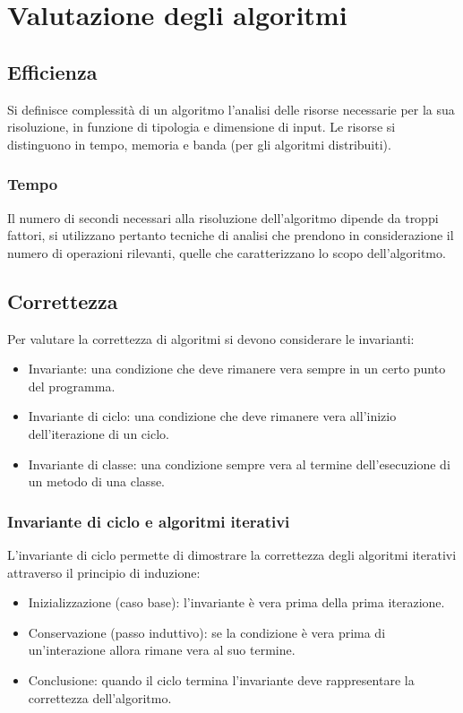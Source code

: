 \section{Valutazione degli algoritmi}
\subsection{Efficienza}
Si definisce complessit\`a di un algoritmo l'analisi delle risorse necessarie per la sua risoluzione, in funzione di tipologia e dimensione di input. Le 
risorse si distinguono in tempo, memoria e banda (per gli algoritmi distribuiti).
\subsubsection{Tempo}
Il numero di secondi necessari alla risoluzione dell'algoritmo dipende da troppi fattori, si utilizzano pertanto tecniche di analisi che prendono in 
considerazione il numero di operazioni rilevanti, quelle che caratterizzano lo scopo dell'algoritmo.
\subsection{Correttezza}
Per valutare la correttezza di algoritmi si devono considerare le invarianti:
\begin{itemize}
\item Invariante: una condizione che deve rimanere vera sempre in un certo punto del programma.
\item Invariante di ciclo: una condizione che deve rimanere vera all'inizio dell'iterazione di un ciclo.
\item Invariante di classe: una condizione sempre vera al termine dell'esecuzione di un metodo di una classe.
\end{itemize}
\subsubsection{Invariante di ciclo e algoritmi iterativi}
L'invariante di ciclo permette di dimostrare la correttezza degli algoritmi iterativi attraverso il principio di induzione:
\begin{itemize}
\item Inizializzazione (caso base): l'invariante \`e vera prima della prima iterazione.
\item Conservazione (passo induttivo): se la condizione \`e vera prima di un'interazione allora rimane vera al suo termine.
\item Conclusione: quando il ciclo termina l'invariante deve rappresentare la correttezza dell'algoritmo.
\end{itemize}
